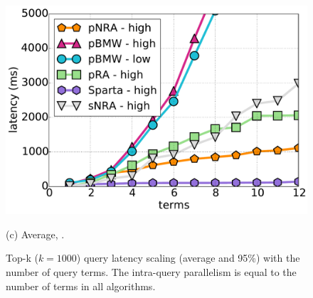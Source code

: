 {{\begin{figure}[tbh]
\begin{minipage}{0.33\textwidth}
    \includegraphics[width=\textwidth]{figures/latency_12threads_cluewebX10.pdf}
    	         \centerline{(c) Average, \cwten.}
    	         \end{minipage}
\caption{Top-k ($k=1000$) query latency scaling (average and 95\%) with the number of query terms. 
The intra-query parallelism is equal to the number of terms in all algorithms. }
\label{fig:terms-scaling}
\end{figure}



}}
